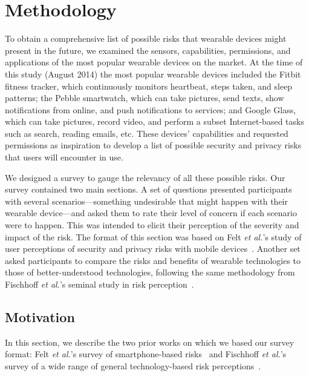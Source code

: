 
\section{Methodology}
To obtain a comprehensive list of possible risks that wearable devices might present in the future, we examined the sensors, capabilities, permissions, and applications of the most popular wearable devices on the market. At the time of this study (August 2014) the most popular wearable devices included the Fitbit fitness tracker, which continuously monitors heartbeat, steps taken, and sleep patterns;
the Pebble smartwatch, which can take pictures, send texts, show notifications from online, and push notifications to services; %
and Google Glass, which can take pictures, record video, and perform a subset Internet-based tasks such as search, reading emails, etc. %
These devices' capabilities and requested permissions as inspiration to develop a list of possible security and privacy risks that users will encounter in use.

We designed a survey to gauge the relevancy of all these possible risks.
Our survey contained two main sections. A set of questions presented participants with several scenarios---something undesirable that might happen with their wearable device---and asked them to rate their level of concern if each scenario were to happen. This was intended to elicit their perception of the severity and impact of the risk.
The format of this section was based on Felt {\it et al.}'s study of user perceptions of security and privacy risks with mobile devices~\cite{Felt}. Another set asked participants to compare the risks and benefits of wearable technologies to those of better-understood technologies, following the same methodology from Fischhoff {\it et al.}'s seminal study in risk perception~\cite{Fischhoff}.

\subsection{Motivation}
In this section, we describe the two prior works on which we based our survey format: Felt {\it et al.}'s survey of smartphone-based risks~\cite{Felt} and Fischhoff {\it et al.}'s survey of a wide range of general technology-based risk perceptions~\cite{Fischhoff}.


